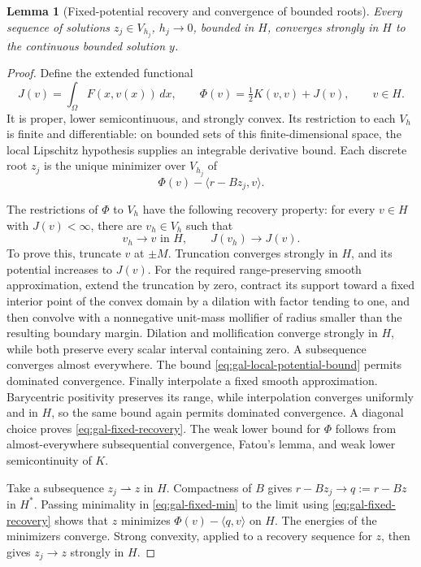\documentclass[11pt,a4paper]{article}
\newtheorem{lemma}[theorem]{Lemma}
\theoremstyle{definition}
\theoremstyle{remark}
\numberwithin{equation}{section}
\begin{document}
\begin{lemma}[Fixed-potential recovery and convergence of bounded roots]\label{lem:gal-bounded-roots}
Every sequence of solutions $z_j\in V_{h_j}$, $h_j\to0$, bounded in $H$, converges strongly in $H$ to the continuous bounded solution $y$.
\end{lemma}
\begin{proof}
Define the extended functional
\[
 J(v)=\int_\Omega F(x,v(x))\,dx,\qquad
 \Phi(v)=\tfrac12K(v,v)+J(v),\qquad v\in H.
\]
It is proper, lower semicontinuous, and strongly convex. Its restriction to each $V_h$ is finite and differentiable: on bounded sets of this finite-dimensional space, the local Lipschitz hypothesis supplies an integrable derivative bound. Each discrete root $z_j$ is the unique minimizer over $V_{h_j}$ of
\begin{equation}\label{eq:gal-fixed-min}
 \Phi(v)-\langle r-Bz_j,v\rangle.
\end{equation}

The restrictions of $\Phi$ to $V_h$ have the following recovery property: for every $v\in H$ with $J(v)<\infty$, there are $v_h\in V_h$ such that
\begin{equation}\label{eq:gal-fixed-recovery}
 v_h\to v\text{ in }H,\qquad J(v_h)\to J(v).
\end{equation}
To prove this, truncate $v$ at $\pm M$. Truncation converges strongly in $H$, and its potential increases to $J(v)$. For the required range-preserving smooth approximation, extend the truncation by zero, contract its support toward a fixed interior point of the convex domain by a dilation with factor tending to one, and then convolve with a nonnegative unit-mass mollifier of radius smaller than the resulting boundary margin. Dilation and mollification converge strongly in $H$, while both preserve every scalar interval containing zero. A subsequence converges almost everywhere. The bound \eqref{eq:gal-local-potential-bound} permits dominated convergence. Finally interpolate a fixed smooth approximation. Barycentric positivity preserves its range, while interpolation converges uniformly and in $H$, so the same bound again permits dominated convergence. A diagonal choice proves \eqref{eq:gal-fixed-recovery}. The weak lower bound for $\Phi$ follows from almost-everywhere subsequential convergence, Fatou's lemma, and weak lower semicontinuity of $K$.

Take a subsequence $z_j\rightharpoonup z$ in $H$. Compactness of $B$ gives $r-Bz_j\to q:=r-Bz$ in $H^*$. Passing minimality in \eqref{eq:gal-fixed-min} to the limit using \eqref{eq:gal-fixed-recovery} shows that $z$ minimizes $\Phi(v)-\langle q,v\rangle$ on $H$. The energies of the minimizers converge. Strong convexity, applied to a recovery sequence for $z$, then gives $z_j\to z$ strongly in $H$.


\end{proof}
\end{document}
